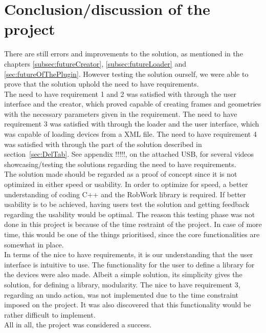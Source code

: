 \section{Conclusion/discussion of the project}
There are still errors and improvements to the solution, as mentioned in the chapters \ref{subsec:futureCreator}, \ref{subsec:futureLoader} and \ref{sec:futureOfThePlugin}. However testing the solution ourself, we were able to prove that the solution uphold the need to have requirements.\\

The need to have requirement 1 and 2 was satisfied with through the user interface and the creator, which proved capable of creating frames and geometries with the necessary parameters given in the requirement.
The need to have requirement 3 was satisfied with through the loader and the user interface, which was capable of loading devices from a XML file.
The need to have requirement 4 was satisfied with through the part of the solution described in section~\ref{sec:DelTab}. See appendix !!!!!, on the attached USB, for several videos showcasing/testing the solutions regarding the need to have requirements.\\

The solution made should be regarded as a proof of concept since it is not optimized in either speed or usability. In order to optimize for speed, a better understanding of coding C++ and the RobWork library is required. If better usability is to be achieved, having users test the solution and getting feedback regarding the usability would be optimal. The reason this testing phase was not done in this project is because of the time restraint of the project. In case of more time, this would be one of the things prioritised, since the core functionalities are somewhat in place.\\

In terms of the nice to have requirements, it is our understanding that the user interface is intuitive to use. The functionality for the user to define a library for the devices were also made. Albeit a simple solution, its simplicity gives the solution, for defining a library, modularity. The nice to have requirement 3, regarding an undo action, was not implemented due to the time constraint imposed on the project. It was also discovered that this functionality would be rather difficult to implement.\\

All in all, the project was considered a success.
